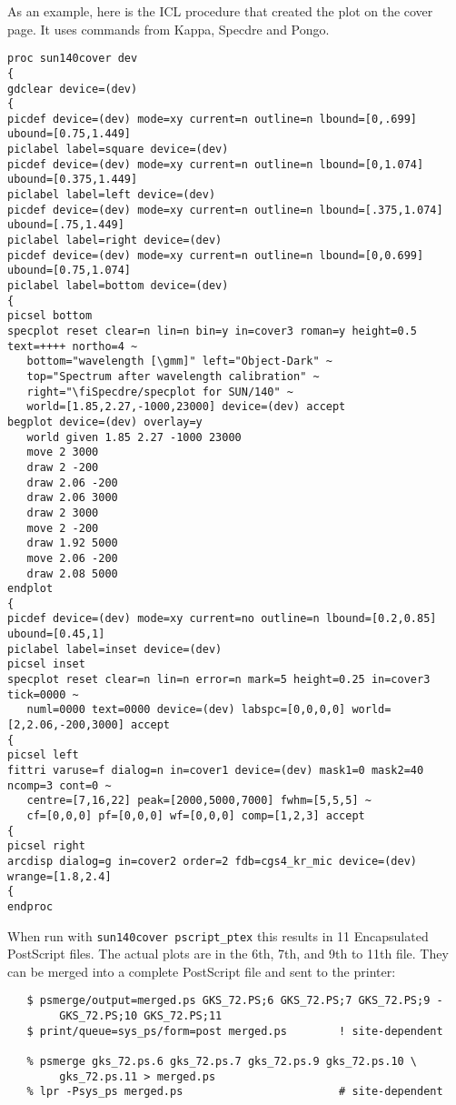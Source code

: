 As an example, here is the ICL procedure that created the plot on the
cover page.  It uses commands from Kappa, Specdre and Pongo.

\goodbreak
\small
\begin{verbatim}
proc sun140cover dev
{
gdclear device=(dev)
{
picdef device=(dev) mode=xy current=n outline=n lbound=[0,.699] ubound=[0.75,1.449]
piclabel label=square device=(dev)
picdef device=(dev) mode=xy current=n outline=n lbound=[0,1.074] ubound=[0.375,1.449]
piclabel label=left device=(dev)
picdef device=(dev) mode=xy current=n outline=n lbound=[.375,1.074] ubound=[.75,1.449]
piclabel label=right device=(dev)
picdef device=(dev) mode=xy current=n outline=n lbound=[0,0.699] ubound=[0.75,1.074]
piclabel label=bottom device=(dev)
{
picsel bottom
specplot reset clear=n lin=n bin=y in=cover3 roman=y height=0.5 text=++++ northo=4 ~
   bottom="wavelength [\gmm]" left="Object-Dark" ~
   top="Spectrum after wavelength calibration" ~
   right="\fiSpecdre/specplot for SUN/140" ~
   world=[1.85,2.27,-1000,23000] device=(dev) accept
begplot device=(dev) overlay=y
   world given 1.85 2.27 -1000 23000
   move 2 3000
   draw 2 -200
   draw 2.06 -200
   draw 2.06 3000
   draw 2 3000
   move 2 -200
   draw 1.92 5000
   move 2.06 -200
   draw 2.08 5000
endplot
{
picdef device=(dev) mode=xy current=no outline=n lbound=[0.2,0.85] ubound=[0.45,1]
piclabel label=inset device=(dev)
picsel inset
specplot reset clear=n lin=n error=n mark=5 height=0.25 in=cover3 tick=0000 ~
   numl=0000 text=0000 device=(dev) labspc=[0,0,0,0] world=[2,2.06,-200,3000] accept
{
picsel left
fittri varuse=f dialog=n in=cover1 device=(dev) mask1=0 mask2=40 ncomp=3 cont=0 ~
   centre=[7,16,22] peak=[2000,5000,7000] fwhm=[5,5,5] ~
   cf=[0,0,0] pf=[0,0,0] wf=[0,0,0] comp=[1,2,3] accept
{
picsel right
arcdisp dialog=g in=cover2 order=2 fdb=cgs4_kr_mic device=(dev) wrange=[1.8,2.4]
{
endproc
\end{verbatim}
\normalsize

When run with {\tt sun140cover pscript\_ptex} this results in 11
Encapsulated PostScript files.  The actual plots are
in the 6th, 7th, and 9th to 11th file.  They can be merged into a
complete PostScript file and sent to the printer:

\goodbreak
\begin{verbatim}
   $ psmerge/output=merged.ps GKS_72.PS;6 GKS_72.PS;7 GKS_72.PS;9 -
        GKS_72.PS;10 GKS_72.PS;11
   $ print/queue=sys_ps/form=post merged.ps        ! site-dependent

   % psmerge gks_72.ps.6 gks_72.ps.7 gks_72.ps.9 gks_72.ps.10 \
        gks_72.ps.11 > merged.ps
   % lpr -Psys_ps merged.ps                        # site-dependent
\end{verbatim}


